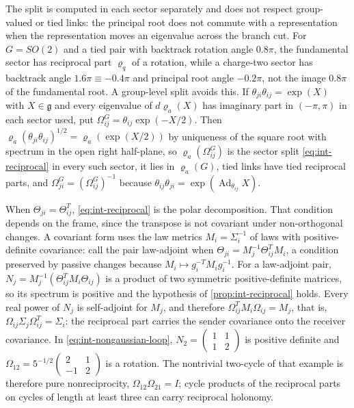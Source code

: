 The split is computed in each sector separately and does not respect group-valued or tied links: the principal root does not commute with a representation when the representation moves an eigenvalue across the branch cut. For $G=SO(2)$ and a tied pair with backtrack rotation angle $0.8\pi$, the fundamental sector has reciprocal part $\varrho_q$ of a rotation, while a charge-two sector has backtrack angle $1.6\pi\equiv-0.4\pi$ and principal root angle $-0.2\pi$, not the image $0.8\pi$ of the fundamental root. A group-level split avoids this. If $\theta_{ji}\theta_{ij}=\exp(X)$ with $X\in\mathfrak g$ and every eigenvalue of $d\varrho_a(X)$ has imaginary part in $(-\pi,\pi)$ in each sector used, put $\Omega^G_{ij}=\theta_{ij}\exp(-X/2)$. Then $\varrho_a(\theta_{ji}\theta_{ij})^{1/2}=\varrho_a(\exp(X/2))$ by uniqueness of the square root with spectrum in the open right half-plane, so $\varrho_a(\Omega^G_{ij})$ is the sector split \cref{eq:int-reciprocal} in every such sector, it lies in $\varrho_a(G)$, tied links have tied reciprocal parts, and $\Omega^G_{ji}=(\Omega^G_{ij})^{-1}$ because $\theta_{ij}\theta_{ji}=\exp(\operatorname{Ad}_{\theta_{ij}}X)$.

When $\Theta_{ji}=\Theta_{ij}^T$, \cref{eq:int-reciprocal} is the polar decomposition. That condition depends on the frame, since the transpose is not covariant under non-orthogonal changes. A covariant form uses the law metrics $M_i=\Sigma_i^{-1}$ of laws with positive-definite covariance: call the pair law-adjoint when $\Theta_{ji}=M_j^{-1}\Theta_{ij}^TM_i$, a condition preserved by passive changes because $M_i\mapsto g_i^{-T}M_ig_i^{-1}$. For a law-adjoint pair, $N_j=M_j^{-1}(\Theta_{ij}^TM_i\Theta_{ij})$ is a product of two symmetric positive-definite matrices, so its spectrum is positive and the hypothesis of \cref{prop:int-reciprocal} holds. Every real power of $N_j$ is self-adjoint for $M_j$, and therefore $\Omega_{ij}^TM_i\Omega_{ij}=M_j$, that is, $\Omega_{ij}\Sigma_j\Omega_{ij}^T=\Sigma_i$: the reciprocal part carries the sender covariance onto the receiver covariance. In \cref{eq:int-nongaussian-loop}, $N_2=\begin{pmatrix}1&1\\1&2\end{pmatrix}$ is positive definite and $\Omega_{12}=5^{-1/2}\begin{pmatrix}2&1\\-1&2\end{pmatrix}$ is a rotation. The nontrivial two-cycle of that example is therefore pure nonreciprocity, $\Omega_{12}\Omega_{21}=I$; cycle products of the reciprocal parts on cycles of length at least three can carry reciprocal holonomy.

